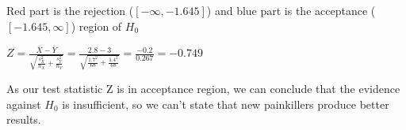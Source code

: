 \documentclass[12pt]{article}
\begin{document}
Red part is the rejection ($[-\infty, -1.645]$) and blue part is the acceptance ($[-1.645, \infty]$) region of $H_0$\\ \par

$Z = \frac{\bar{X} - \bar{Y}}{\sqrt{\frac{s_X^2}{n_X} + \frac{s_Y^2}{n_Y}}} = \frac{2.8 - 3}{\sqrt{\frac{1.7^2}{68} + \frac{1.4^2}{68}}} = \frac{-0.2}{0.267} = -0.749$\\ \par 
As our test statistic Z is in acceptance region, we can conclude that the evidence against $H_0$ is insufficient, so we can't state that new painkillers produce better results.  
\end{document}

